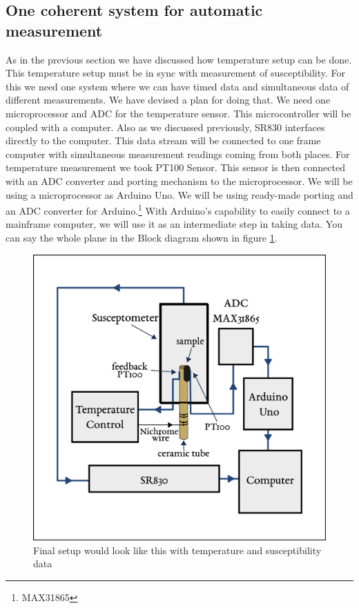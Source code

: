 \subsection{One coherent system for automatic measurement}
 As in the previous section we have discussed how temperature setup can be done. This temperature setup must be in sync with measurement of susceptibility. For this we need one system where we can have timed data and simultaneous data of different measurements. We have devised a plan for doing that. We need one microprocessor and ADC for the temperature sensor. This microcontroller will be coupled with a computer. Also as we discussed previously, SR830 interfaces directly to the computer. This data stream will be connected to one frame computer with simultaneous measurement readings coming from both places.
For temperature measurement we took PT100 Sensor. This sensor is then connected with an ADC converter and porting mechanism to the microprocessor. We will be using a microprocessor as Arduino Uno. We will be using ready-made porting and an ADC converter for Arduino.\footnote{MAX31865} With Arduino’s capability to easily connect to a mainframe computer, we will use it as an intermediate step in taking data. You can say the whole plane in the Block diagram shown in figure \ref{fig:setupimage}.

\begin{figure}[hbt!]
  \includegraphics[width= \linewidth]{setup.png}
  \caption{Final setup would look like this with temperature and susceptibility data}
  \label{fig:setupimage}
\end{figure}

